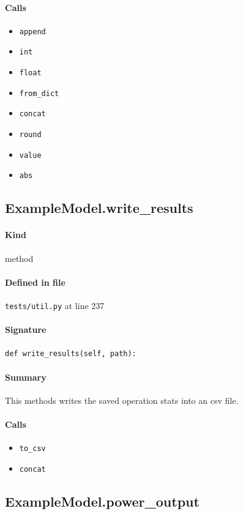 \documentclass[11pt]{report}
\begin{document}
\paragraph{Calls}
\begin{itemize}[leftmargin=*]
  \item \texttt{append}
  \item \texttt{int}
  \item \texttt{float}
  \item \texttt{from\_dict}
  \item \texttt{concat}
  \item \texttt{round}
  \item \texttt{value}
  \item \texttt{abs}
\end{itemize}
\subsection{ExampleModel.write\_results}
\label{def:tests-util.py:ExampleModel.write_results:L237}
\paragraph{Kind} method
\paragraph{Defined in file} \texttt{tests/util.py} at line 237
\paragraph{Signature} \texttt{def write\_results(self, path):}
\paragraph{Summary} This methods writes the saved operation stats into an csv file.
\paragraph{Calls}
\begin{itemize}[leftmargin=*]
  \item \texttt{to\_csv}
  \item \texttt{concat}
\end{itemize}
\subsection{ExampleModel.power\_output}
\label{def:tests-util.py:ExampleModel.power_output:L251}
\end{document}
